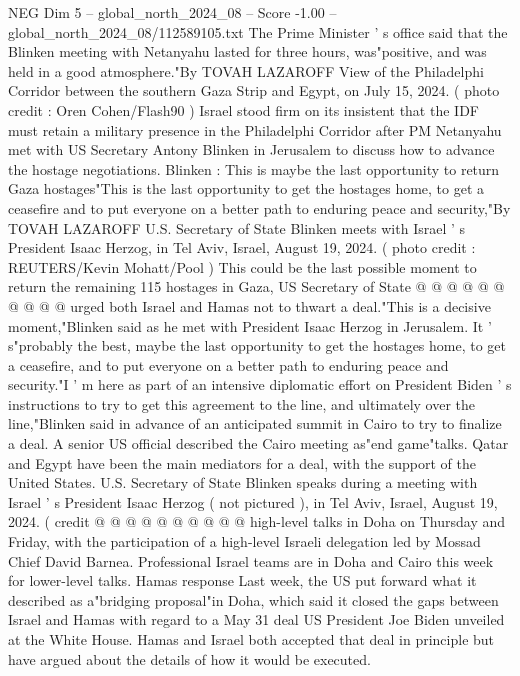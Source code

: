 \begin{textsample}{NEG Dim 5 – global\_north\_2024\_08 – Score -1.00 – global\_north\_2024\_08/112589105.txt}  \label{ex:f5_neg_067}
The Prime Minister ' s office said that the Blinken meeting with Netanyahu lasted for three hours, was"positive, and was held in a good atmosphere."By TOVAH LAZAROFF View of the Philadelphi Corridor between the southern Gaza Strip and Egypt, on July 15, 2024. ( photo credit : Oren Cohen/Flash90 ) Israel stood firm on its insistent that the IDF must retain a military presence in the Philadelphi Corridor after PM Netanyahu met with US Secretary Antony Blinken in Jerusalem to discuss how to advance the hostage negotiations.
Blinken : This is maybe the last opportunity to return Gaza hostages"This is the last opportunity to get the hostages home, to get a ceasefire and to put everyone on a better path to enduring peace and security,"By TOVAH LAZAROFF U.S.
Secretary of State Blinken meets with Israel ' s President Isaac Herzog, in Tel Aviv, Israel, August 19, 2024. ( photo credit : REUTERS/Kevin Mohatt/Pool ) This could be the last possible moment to return the remaining 115 hostages in Gaza, US Secretary of State @ @ @ @ @ @ @ @ @ @ urged both Israel and Hamas not to thwart a deal."This is a decisive moment,"Blinken said as he met with President Isaac Herzog in Jerusalem.
It ' s"probably the best, maybe the last opportunity to get the hostages home, to get a ceasefire, and to put everyone on a better path to enduring peace and security."I ' m here as part of an intensive diplomatic effort on President Biden ' s instructions to try to get this agreement to the line, and ultimately over the line,"Blinken said in advance of an anticipated summit in Cairo to try to finalize a deal.
A senior US official described the Cairo meeting as"end game"talks.
Qatar and Egypt have been the main mediators for a deal, with the support of the United States.
U.S.
Secretary of State Blinken speaks during a meeting with Israel ' s President Isaac Herzog ( not pictured ), in Tel Aviv, Israel, August 19, 2024. ( credit @ @ @ @ @ @ @ @ @ @ high-level talks in Doha on Thursday and Friday, with the participation of a high-level Israeli delegation led by Mossad Chief David Barnea.
Professional Israel teams are in Doha and Cairo this week for lower-level talks.
Hamas response Last week, the US put forward what it described as a"bridging proposal"in Doha, which said it closed the gaps between Israel and Hamas with regard to a May 31 deal US President Joe Biden unveiled at the White House.
Hamas and Israel both accepted that deal in principle but have argued about the details of how it would be executed.

\end{textsample}
